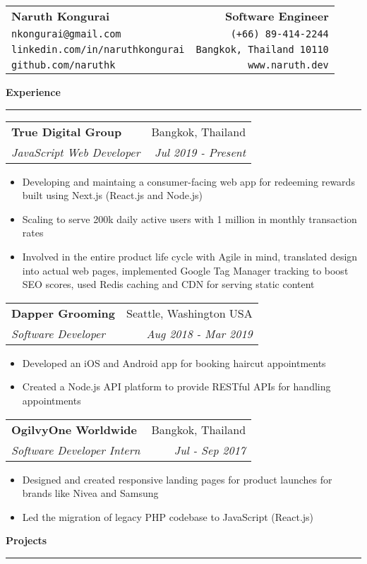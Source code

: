 \documentclass[10pt,a4paper]{article}
\makeatletter
\newcommand{\bio}[8]{
  \begin{tabular*}{7.5in}{l@{\extracolsep{\fill}}r}
    \textbf{\LARGE #1} & \textbf{\large #2} \\
    \texttt{#3} & \texttt{#4} \\
    \texttt{#5} & \texttt{#6} \\
    \texttt{#7} & \texttt{#8}
  \end{tabular*}
}
\newcommand{\sectionheading}[1]{
  \vspace{12pt}

  \textbf{\large #1}

  \vspace{-8pt}
  \textcolor{bordercolor}{\hrule}
  \vspace{6pt}
}
\newcommand{\subheadinginfo}[4]{
  \vspace{6pt}
  
  \begin{tabular*}{7.5in}{l@{\extracolsep{\fill}}r}
    \textbf{#1} & #2 \\
    \textit{#3} & \textit{#4} \\
  \end{tabular*}
  
  \vspace{-4pt}
}
\newcommand{\listitem}[1]{
  \item #1 \vspace{-5pt}
}
\makeatother
\begin{document}
\bio
{Naruth Kongurai}
{Software Engineer}
{nkongurai@gmail.com}
{(+66) 89-414-2244}
{linkedin.com/in/naruthkongurai}
{Bangkok, Thailand 10110}
{github.com/naruthk}
{www.naruth.dev}

\sectionheading{Experience}

\subheadinginfo
{True Digital Group}
{Bangkok, Thailand}
{JavaScript Web Developer}
{Jul 2019 - Present}

\begin{itemize}
  \listitem{Developing and maintaing a consumer-facing web app for redeeming 
  rewards built using Next.js (React.js and Node.js)}
  \listitem{Scaling to serve 200k daily active users with 1 million 
  in monthly transaction rates}
  \listitem{Involved in the entire product life cycle with Agile in mind, 
  translated design into actual web pages, implemented Google Tag Manager 
  tracking to boost SEO scores, used Redis caching and CDN for serving static content}
\end{itemize}

\subheadinginfo
{Dapper Grooming}
{Seattle, Washington USA}
{Software Developer}
{Aug 2018 - Mar 2019}

\begin{itemize}
  \listitem{Developed an iOS and Android app for booking haircut appointments}
  \listitem{Created a Node.js API platform to provide RESTful APIs for handling appointments}
\end{itemize}

\subheadinginfo
{OgilvyOne Worldwide}
{Bangkok, Thailand}
{Software Developer Intern}
{Jul - Sep 2017}

\begin{itemize}
  \listitem{Designed and created responsive landing pages for product 
  launches for brands like Nivea and Samsung}
  \listitem{Led the migration of legacy PHP codebase to JavaScript (React.js)}
\end{itemize}

\sectionheading{Projects}
\end{document}

